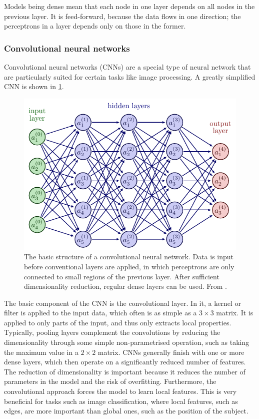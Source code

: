 Models being dense mean that each node in one layer depends on all nodes in the previous layer.
It is feed-forward, because the data flows in one direction; the perceptrons in a layer depends only on those in the former.

\subsubsection{Convolutional neural networks}
\label{sec:cnn}
Convolutional neural networks (CNNs) are a special type of neural network that are particularly suited for certain tasks like image processing.
A greatly simplified CNN is shown in \cref{fig:cnn}.

\begin{figure}
    \centering
    \includegraphics[width=0.75\linewidth, page=7]{neural_networks.pdf}
    \caption{
        The basic structure of a convolutional neural network.
        Data is input before conventional layers are applied, in which perceptrons are only connected to small regions of the previous layer.
        After sufficient dimensionality reduction, regular dense layers can be used.
        From \cite{nn_figs}.
    }
    \label{fig:cnn}
\end{figure}

The basic component of the CNN is the convolutional layer.
In it, a kernel or filter is applied to the input data, which often is as simple as a $3 \times 3$ matrix.
It is applied to only parts of the input, and thus only extracts local properties.
Typically, pooling layers complement the convolutions by reducing the dimensionality through some simple non-parametrised operation, such as taking the maximum value in a $2 \times 2$ matrix.
CNNs generally finish with one or more dense layers, which then operate on a significantly reduced number of features.
The reduction of dimensionality is important because it reduces the number of parameters in the model and the risk of overfitting.
Furthermore, the convolutional approach forces the model to learn local features.
This is very beneficial for tasks such as image classification, where local features, such as edges, are more important than global ones, such as the position of the subject.

